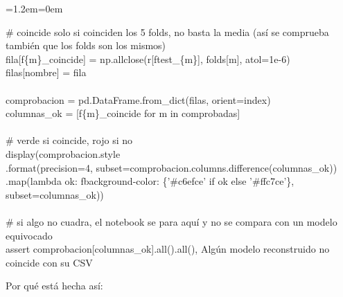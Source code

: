 \documentclass[11pt,a4paper]{article}
\newenvironment{codigo}
  {\par\smallskip\begin{list}{}{\leftmargin=1.2em\rightmargin=0em}\item\relax\ttfamily\scriptsize\raggedright}
  {\end{list}\smallskip}
\begin{document}
{\begin{codigo}
\hspace*{4.16em}\# coincide solo si coinciden los 5 folds, no basta la media (así se comprueba también que los folds son los mismos) \\{}
\hspace*{4.16em}fila[f\textquotedbl{}\{m\}\_\allowbreak{}coincide\textquotedbl{}] = np.allclose(r[f\textquotedbl{}test\_\allowbreak{}\{m\}\textquotedbl{}], folds[m], atol=1e-6) \\{}
\hspace*{2.08em}filas[nombre] = fila \\{}
\mbox{} \\{}
comprobacion = pd.DataFrame.from\_\allowbreak{}dict(filas, orient=\textquotedbl{}index\textquotedbl{}) \\{}
columnas\_\allowbreak{}ok = [f\textquotedbl{}\{m\}\_\allowbreak{}coincide\textquotedbl{} for m in comprobadas] \\{}
\mbox{} \\{}
\# verde si coincide, rojo si no \\{}
display(comprobacion.style \\{}
\hspace*{4.16em}.format(precision=4, subset=comprobacion.columns.difference(columnas\_\allowbreak{}ok)) \\{}
\hspace*{4.16em}.map(lambda ok: f\textquotedbl{}background-color: \{'\#c6efce' if ok else '\#ffc7ce'\}\textquotedbl{}, subset=columnas\_\allowbreak{}ok)) \\{}
\mbox{} \\{}
\# si algo no cuadra, el notebook se para aquí y no se compara con un modelo equivocado \\{}
assert comprobacion[columnas\_\allowbreak{}ok].all().all(), \textquotedbl{}Algún modelo reconstruido no coincide con su CSV\textquotedbl{}
\end{codigo}
Por qué está hecha así:

}
\end{document}
